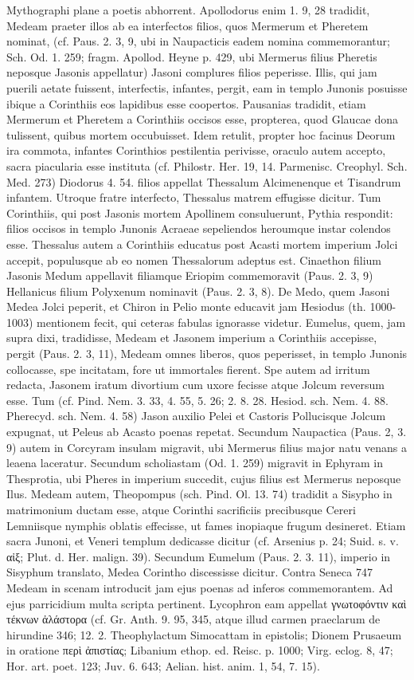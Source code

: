\documentclass[a4paper, 11pt, oneside, polutonikogreek, german]{article}
\begin{document}
Mythographi plane a poetis abhorrent. Apollodorus enim 1. 9, 28 tradidit, Medeam praeter illos ab ea interfectos filios, quos Mermerum et Pheretem nominat, (cf. Paus. 2. 3, 9, ubi in Naupacticis eadem nomina commemorantur; Sch. Od. 1. 259; fragm. Apollod. Heyne p. 429, ubi Mermerus filius Pheretis neposque Jasonis appellatur) Jasoni complures filios peperisse. Illis, qui jam puerili aetate fuissent, interfectis, infantes, pergit, eam in templo Junonis posuisse ibique a Corinthiis eos lapidibus esse coopertos. Pausanias tradidit, etiam Mermerum et Pheretem a Corinthiis occisos esse, propterea, quod Glaucae dona tulissent, quibus mortem occubuisset. Idem retulit, propter hoc facinus Deorum ira commota, infantes Corinthios pestilentia perivisse, oraculo autem accepto, sacra piacularia esse instituta (cf. Philostr. Her. 19, 14. Parmenisc. Creophyl. Sch. Med. 273) Diodorus 4. 54. filios appellat Thessalum Alcimenenque et Tisandrum infantem. Utroque fratre interfecto, Thessalus matrem effugisse dicitur. Tum Corinthiis, qui post Jasonis mortem Apollinem consuluerunt, Pythia respondit: filios occisos in templo Junonis Acraeae sepeliendos heroumque instar colendos esse. Thessalus autem a Corinthiis educatus post Acasti mortem imperium Jolci accepit, populusque ab eo nomen Thessalorum adeptus est. Cinaethon filium Jasonis Medum appellavit filiamque Eriopim commemoravit (Paus. 2. 3, 9) Hellanicus filium Polyxenum nominavit (Paus. 2. 3, 8). De Medo, quem Jasoni Medea Jolci peperit, et Chiron in Pelio monte educavit jam Hesiodus (th. 1000-1003) mentionem fecit, qui ceteras fabulas ignorasse videtur. Eumelus, quem, jam supra dixi, tradidisse, Medeam et Jasonem imperium a Corinthiis accepisse, pergit (Paus. 2. 3, 11), Medeam omnes liberos, quos peperisset, in templo Junonis collocasse, spe incitatam, fore ut immortales fierent. Spe autem ad irritum redacta, Jasonem iratum divortium cum uxore fecisse atque Jolcum reversum esse. Tum (cf. Pind. Nem. 3. 33, 4. 55, 5. 26; 2. 8. 28. Hesiod. sch. Nem. 4. 88. Pherecyd. sch. Nem. 4. 58) Jason auxilio Pelei et Castoris Pollucisque Jolcum expugnat, ut Peleus ab Acasto poenas repetat. Secundum Naupactica (Paus. 2, 3. 9) autem in Corcyram insulam migravit, ubi Mermerus filius major natu venans a leaena laceratur. Secundum scholiastam (Od. 1. 259) migravit in Ephyram in Thesprotia, ubi Pheres in imperium succedit, cujus filius est Mermerus neposque Ilus. Medeam autem, Theopompus (sch. Pind. Ol. 13. 74) tradidit a Sisypho in matrimonium ductam esse, atque Corinthi sacrificiis precibusque Cereri Lemniisque nymphis oblatis effecisse, ut fames inopiaque frugum desineret. Etiam sacra Junoni, et Veneri templum dedicasse dicitur (cf. Arsenius p. 24; Suid. s. v. αἰξ; Plut. d. Her. malign. 39). Secundum Eumelum (Paus. 2. 3. 11), imperio in Sisyphum translato, Medea Corintho discessisse dicitur. Contra Seneca 747 Medeam in scenam introducit jam ejus poenas ad inferos commemorantem. Ad ejus parricidium multa scripta pertinent. Lycophron eam appellat γνωτοφόντιν καὶ τέκνων ἀλάστορα (cf. Gr. Anth. 9. 95, 345, atque illud carmen praeclarum de hirundine 346; 12. 2. Theophylactum Simocattam in epistolis; Dionem Prusaeum in oratione περὶ ἀπιστίας; Libanium ethop. ed. Reisc. p. 1000; Virg. eclog. 8, 47; Hor. art. poet. 123; Juv. 6. 643; Aelian. hist. anim. 1, 54, 7. 15).
\end{document}
